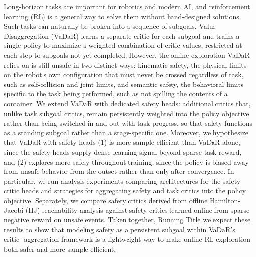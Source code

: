 
Long-horizon tasks are important for robotics and modern AI, and reinforcement learning (RL)
is a general way to solve them without hand-designed solutions. Such tasks can naturally be broken
into a sequence of subgoals. Value Disaggregation (VaDaR) learns a separate critic for each subgoal
and trains a single policy to maximize a weighted combination of critic values, restricted at each
step to subgoals not yet completed. However, the online exploration VaDaR relies on is still unsafe
in two distinct ways: kinematic safety, the physical limits on the robot’s own configuration that must
never be crossed regardless of task, such as self-collision and joint limits, and semantic safety, the
behavioral limits specific to the task being performed, such as not spilling the contents of a container.
We extend VaDaR with dedicated safety heads: additional critics that, unlike task subgoal critics,
remain persistently weighted into the policy objective rather than being switched in and out with task
progress, so that safety functions as a standing subgoal rather than a stage-specific one. Moreover, we
hypothesize that VaDaR with safety heads (1) is more sample-efficient than VaDaR alone, since the
safety heads supply dense learning signal beyond sparse task reward, and (2) explores more safely
throughout training, since the policy is biased away from unsafe behavior from the outset rather
than only after convergence. In particular, we run analysis experiments comparing architectures for
the safety critic heads and strategies for aggregating safety and task critics into the policy objective.
Separately, we compare safety critics derived from offline Hamilton-Jacobi (HJ) reachability analysis
against safety critics learned online from sparse negative reward on unsafe events. Taken together,
Running Title
we expect these results to show that modeling safety as a persistent subgoal within VaDaR’s critic-
aggregation framework is a lightweight way to make online RL exploration both safer and more
sample-efficient.